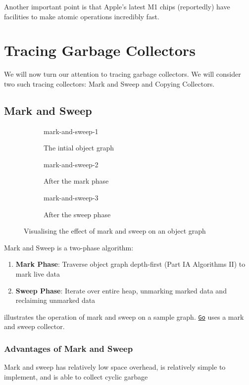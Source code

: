 Another important point is that Apple's latest M1 chips (reportedly) have facilities to make atomic operations incredibly fast. 

\section{Tracing Garbage Collectors}
We will now turn our attention to tracing garbage collectors. We will consider two such tracing collectors: Mark and Sweep and Copying Collectors.

\subsection{Mark and Sweep}
\begin{figure}[H]
    \centering
    \begin{subfigure}{0.31\textwidth}
        {mark-and-sweep-1}
        \caption{The intial object graph}
        \label{fig:m&s-1}
    \end{subfigure}
    \begin{subfigure}{0.31\textwidth}
        {mark-and-sweep-2}
        \caption{After the mark phase}
        \label{fig:m&s-2}
    \end{subfigure}
    \begin{subfigure}{0.31\textwidth}
        {mark-and-sweep-3}
        \caption{After the sweep phase}
        \label{fig:m&s-3}
    \end{subfigure}
    \caption{Visualising the effect of mark and sweep on an object graph}
    \label{fig:mark-and-sweep-example}
\end{figure}
Mark and Sweep is a two-phase algorithm:
\begin{enumerate}
    \item \textbf{Mark Phase}: Traverse object graph depth-first (\textsf{Part IA Algorithms II}) to mark live data
    \item \textbf{Sweep Phase}: Iterate over entire heap, unmarking marked data and reclaiming unmarked data
\end{enumerate}

 illustrates the operation of mark and sweep on a sample graph. \href{https://tip.golang.org/doc/gc-guide}{\texttt{Go}} uses a mark and sweep collector.

\subsubsection{Advantages of Mark and Sweep}
Mark and sweep has relatively low space overhead, is relatively simple to implement, and is able to collect cyclic garbage

